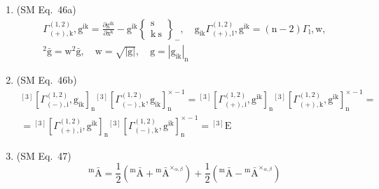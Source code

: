 \documentclass[12pt]{article}
\begin{document}
\begin{enumerate}[label=(\arabic*), series=formellist]
    \item (SM Eq.\ 46a) 
    \[
    \begin{gathered}
    \Gamma^{(1,2)}_{(+),\mathrm{k}}, \mathrm{g}^{\mathrm{ik}} = \frac{\partial \mathrm{g}^{\mathrm{ik}}}{\partial \mathrm{x^k}} - \mathrm{g}^{\mathrm{ik}} \left\{ \begin{smallmatrix} \mathrm{s} \\ \mathrm{k\ s} \end{smallmatrix} \right\}_-, \quad \mathrm{g}_{\mathrm{ik}} \Gamma^{(1,2)}_{(+),\mathrm{l}}, \mathrm{g}^{\mathrm{ik}} = (\mathrm{n}-2) \Gamma_\mathrm{l}, \mathrm{w}, \\
    {}^2\bar{\mathrm{g}} = \mathrm{w}^2 \bar{\mathrm{g}}, \quad \mathrm{w} = \sqrt{|\mathrm{g}|}, \quad \mathrm{g} = |\mathrm{g}_{\mathrm{ik}}|_\mathrm{n}
    \end{gathered}
    \]

    \item (SM Eq.\ 46b) 
    \[
    \begin{gathered}
    {}^{[3]}\left[ \Gamma^{(1,2)}_{(-),\mathrm{i}}, \mathrm{g}_{\mathrm{ik}} \right]_\mathrm{n} {}^{[3]}\left[ \Gamma^{(1,2)}_{(-),\mathrm{k}}, \mathrm{g}_{\mathrm{ik}} \right]_\mathrm{n}^{\times -1} = {}^{[3]}\left[ \Gamma^{(1,2)}_{(+),\mathrm{i}}, \mathrm{g}^{\mathrm{ik}} \right]_\mathrm{n} {}^{[3]}\left[ \Gamma^{(1,2)}_{(+),\mathrm{k}}, \mathrm{g}^{\mathrm{ik}} \right]_\mathrm{n}^{\times -1} = \\
    = {}^{[3]}\left[ \Gamma^{(1,2)}_{(+),\mathrm{i}}, \mathrm{g}^{\mathrm{ik}} \right]_\mathrm{n} {}^{[3]}\left[ \Gamma^{(1,2)}_{(-),\mathrm{k}}, \mathrm{g}^{\mathrm{ik}} \right]_\mathrm{n}^{\times -1} = {}^{[3]}\mathrm{E}
    \end{gathered}
    \]

    \item (SM Eq.\ 47) 
    \[
    {}^\mathrm{m}\bar{\mathrm{A}} = \frac{1}{2} \left( {}^\mathrm{m}\bar{\mathrm{A}} + {}^\mathrm{m}\bar{\mathrm{A}}^{\times_{\alpha,\beta}} \right) + \frac{1}{2} \left( {}^\mathrm{m}\bar{\mathrm{A}} - {}^\mathrm{m}\bar{\mathrm{A}}^{\times_{\alpha,\beta}} \right)
    \]


\end{enumerate}
\end{document}
